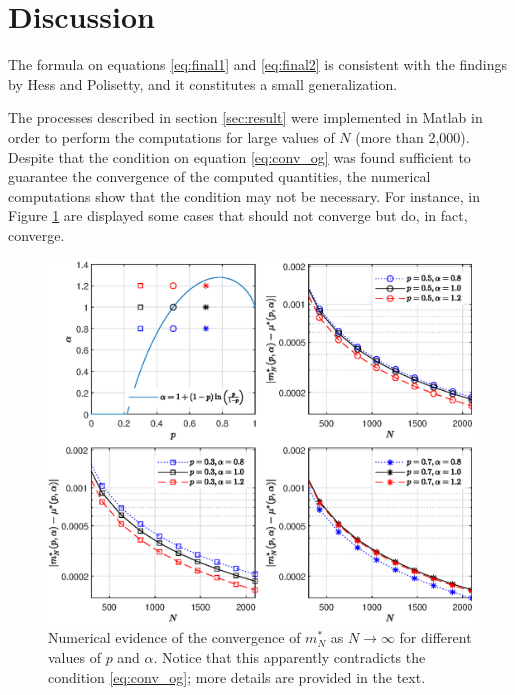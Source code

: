 \documentclass{article}
\begin{document}
\section{Discussion}

The formula on equations \eqref{eq:final1} and \eqref{eq:final2} is consistent with the findings by Hess and Polisetty, and it constitutes a small generalization.

%
The processes described in section \ref{sec:result} were implemented in Matlab in order to perform the computations for large values of $N$ (more than 2,000).
%
Despite that the condition on equation \eqref{eq:conv_og} was found sufficient to guarantee the convergence of the computed quantities, the numerical computations show that the condition may not be necessary.
%
For instance, in Figure \ref{fig:onlyfig} are displayed some cases that should not converge but do, in fact, converge.

\begin{figure}
    \centering
    \includegraphics[width=\linewidth]{./img/paradox02.eps}
    \caption{Numerical evidence of the convergence of $m^*_N$ as $N\rightarrow \infty$ for different values of $p$ and $\alpha$. Notice that this apparently contradicts the condition \eqref{eq:conv_og}; more details are provided in the text.}
    \label{fig:onlyfig}
\end{figure}
\end{document}
